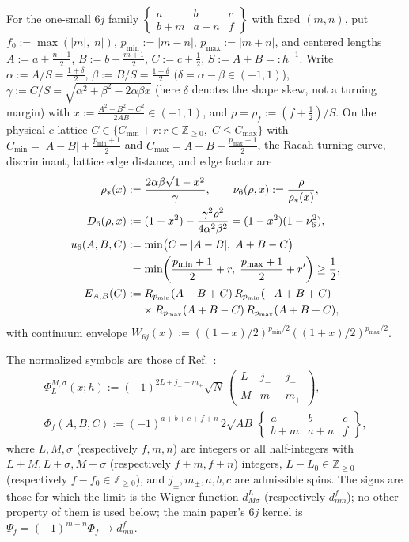 \documentclass[11pt]{article}
\theoremstyle{definition}
\theoremstyle{remark}
\newcommand{\threej}[6]{\begin{pmatrix}#1&#2&#3\\#4&#5&#6\end{pmatrix}}
\newcommand{\sixj}[6]{\begin{Bmatrix}#1&#2&#3\\#4&#5&#6\end{Bmatrix}}
\renewcommand{\_}{\oldunderscore\penalty0\hskip0pt\relax}
\begin{document}
For the one-small $6j$ family $\sixj{a}{b}{c}{b+m}{a+n}{f}$ with fixed $(m,n)$, put $f_0:=\max(|m|,|n|)$, $p_{\min}:=|m-n|$,
  $p_{\max}:=|m+n|$, and centered lengths $A:=a+\frac{n+1}{2}$, $B:=b+\frac{m+1}{2}$, $C:=c+\frac12$, $S:=A+B=:h^{-1}$. Write
  $\alpha:=A/S=\frac{1+\delta}{2}$, $\beta:=B/S=\frac{1-\delta}{2}$ ($\delta=\alpha-\beta\in(-1,1)$),
  $\gamma:=C/S=\sqrt{\alpha^2+\beta^2-2\alpha\beta x}$ (here $\delta$ denotes the shape skew, not a turning margin) with
  $x:=\frac{A^2+B^2-C^2}{2AB}\in(-1,1)$, and
  $\rho=\rho_f:=(f+\frac12)/S$. On the physical $c$-lattice $C\in\{C_{\min}+r:r\in\mathbb{Z}_{\ge 0},\;C\le C_{\max}\}$ with
  $C_{\min}=|A-B|+\frac{p_{\min}+1}{2}$ and $C_{\max}=A+B-\frac{p_{\max}+1}{2}$, the Racah turning curve, discriminant, lattice
  edge distance, and edge factor are
\begin{align}
  \rho_*(x) &:= \frac{2\alpha\beta\sqrt{1-x^2}}{\gamma},\qquad \nu_6(\rho,x) := \frac{\rho}{\rho_*(x)},\notag\\
  D_6(\rho,x) &:= (1-x^2)-\frac{\gamma^2\rho^2}{4\alpha^2\beta^2} = (1-x^2)(1-\nu_6^2), \label{eq:6j-turn}\\
  u_6(A,B,C) &:= \min\bigl(C-|A-B|,\;A+B-C\bigr) \notag\\
  &\phantom{:}= \min\!\left(\frac{p_{\min}+1}{2}+r,\;\frac{p_{\max}+1}{2}+r'\right) \ge \frac12, \label{eq:6j-u}\\
  E_{A,B}(C) &:= R_{p_{\min}}(A-B+C)\,R_{p_{\min}}(-A+B+C) \notag\\
  &\phantom{:=}\;\times R_{p_{\max}}(A+B-C)\,R_{p_{\max}}(A+B+C), \label{eq:6j-edge-factor}
\end{align}
with continuum envelope $W_{6j}(x):=((1-x)/2)^{p_{\min}/2}((1+x)/2)^{p_{\max}/2}$.

The normalized symbols are those of Ref.~\cite[Eqs.~(17) and~(115)]{LewisFixedRank}:
\begin{gather}
  \Phi_L^{M,\sigma}(x;h):=(-1)^{2L+j_++m_+}\sqrt N\,\threej{L}{j_-}{j_+}{M}{m_-}{m_+},\nonumber\\
  \Phi_f(A,B,C):=(-1)^{a+b+c+f+n}\,2\sqrt{AB}\,\sixj{a}{b}{c}{b+m}{a+n}{f},
  \label{eq:Phi-defs}
\end{gather}
where $L,M,\sigma$ (respectively $f,m,n$) are integers or all half-integers with $L\pm M,L\pm\sigma,M\pm\sigma$ (respectively $f\pm m,f\pm n$) integers, $L-L_0\in\mathbb Z_{\ge0}$ (respectively $f-f_0\in\mathbb Z_{\ge0}$), and $j_\pm,m_\pm,a,b,c$ are admissible spins.  The signs are those for which the limit is the Wigner function $d^L_{M\sigma}$ (respectively $d^f_{nm}$); no other property of them is used below; the main paper's $6j$ kernel is $\Psi_f=(-1)^{m-n}\Phi_f\to d^f_{mn}$.
\end{document}
